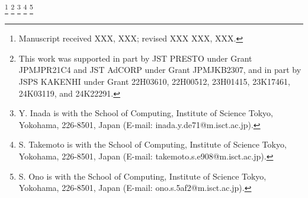 \thanks{
    Manuscript received XXX, XXX; revised XXX XXX, XXX.
}
\thanks{
    This work was supported in part by JST PRESTO under Grant JPMJPR21C4 and JST AdCORP under Grant JPMJKB2307, and in part by JSPS KAKENHI under Grant 22H03610, 22H00512, 23H01415, 23K17461, 24K03119, and 24K22291.
}
\thanks{
    Y. Inada is with the School of Computing, Institute of Science Tokyo, Yokohama, 226-8501, Japan (E-mail: inada.y.de71@m.isct.ac.jp).
}
\thanks{
    S. Takemoto is with the School of Computing, Institute of Science Tokyo, Yokohama, 226-8501, Japan (E-mail: takemoto.s.e908@m.isct.ac.jp).
}
\thanks{
    S. Ono is with the School of Computing, Institute of Science Tokyo, Yokohama, 226-8501, Japan (E-mail: ono.s.5af2@m.isct.ac.jp).
}

